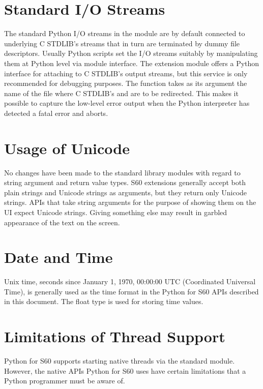 \section{Standard I/O Streams}
\label{subsec:standard}

The standard Python I/O streams in the  module are by
default connected to underlying C STDLIB's  streams that
in turn are terminated by dummy file descriptors. Usually Python
scripts set the I/O streams suitably by manipulating them at Python
level via  module interface. The  extension
module offers a Python interface for attaching to C STDLIB's output
streams, but this service is only recommended for debugging
purposes. The  function takes as its argument the name
of the file where C STDLIB's  and  are to be
redirected. This makes it possible to capture the low-level error
output when the Python interpreter has detected a fatal error and
aborts.

\section{Usage of Unicode}
\label{subsec:usage}
No changes have been made to the standard library modules with regard to 
string argument and return value types. S60 extensions generally 
accept both plain strings and Unicode strings as arguments, but they return 
only Unicode strings. APIs that take string arguments for the purpose of 
showing them on the UI expect Unicode strings. Giving something else may 
result in garbled appearance of the text on the screen.

\section{Date and Time}
\label{subsec:datetime}
Unix time, seconds since January 1, 1970, 00:00:00 UTC (Coordinated 
Universal Time), is generally used as the time format in the Python for 
S60 APIs described in this document. The float type is used for 
storing time values.

\section{Limitations of Thread Support}
\label{subsec:threadlimitations}

Python for S60 supports starting native threads via the standard
 module. However, the native APIs Python for S60 
uses have certain limitations that a Python programmer must be aware of. 

